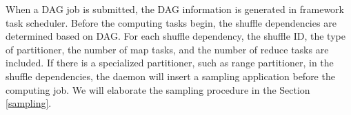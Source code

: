 {\color{blue}
When a DAG job is submitted, the DAG information is generated in framework task scheduler. 
Before the computing tasks begin, the shuffle dependencies are determined based on DAG.
}
For each shuffle dependency, the shuffle ID, the type of partitioner, the number of map tasks, and the number of reduce tasks are included.  If there is a specialized partitioner, such as range partitioner, in the shuffle dependencies, the daemon will insert a sampling application before the {\color{blue}computing job}. We will elaborate the sampling procedure in the Section \ref{sampling}.
